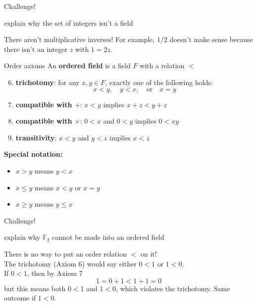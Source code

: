 \documentclass{beamer}
\begin{document}
\begin{frame}{Challenge!}
\begin{prob}
explain why the set of integers isn't a field
\end{prob}
\pause
\begin{soln}
There aren't multiplicative inverses!
\pause
For example, $1/2$ doesn't make sense because there isn't an integer $z$ with $1=2z$.
\end{soln}
\end{frame}

\begin{frame}{Order axioms}
An \textbf{ordered field} is a field $F$ with a relation $<$ 
\begin{enumerate}[\text{A}1]
\setcounter{enumi}{5}
\pause
\item \textbf{trichotomy}: for any $x,y\in F$, exactly one of the following holds:
$$x < y,\quad y < x,\quad\text{or}\quad x = y$$
\pause
\item \textbf{compatible with $+$}: $x < y$ implies $x+z < y+z$
\pause
\item \textbf{compatible with $\times$}: $0 < x$ and $0 < y$ implies $0 < xy$
\pause
\item \textbf{transitivity}: $x < y$ and $y < z$ implies $x < z$
\end{enumerate}
\pause
\textbf{Special notation:}
\begin{itemize}
\item $x > y$ means $y < x$
\item $x \leq y$ means $x < y$ or $x=y$
\item $x \geq y$ means $y \leq x$
\end{itemize}
\end{frame}

\begin{frame}{Challenge!}
\begin{prob}
explain why $\mathbb{F}_2$ cannot be made into an ordered field
\end{prob}
\pause
\begin{soln}
There is no way to put an order relation $<$ on it!\\
\pause
The trichotomy (Axiom 6) would say either $0 < 1$ or $1 < 0$.\\
\pause
If $0 < 1$, then by Axiom 7
$$ 1 = 0+1 < 1+1 = 0$$
but this means both $0 < 1$ and $1 < 0$, which violates the trichotomy.
\pause
Same outcome if $1 < 0$.
\end{soln}
\end{frame}
\end{document}
